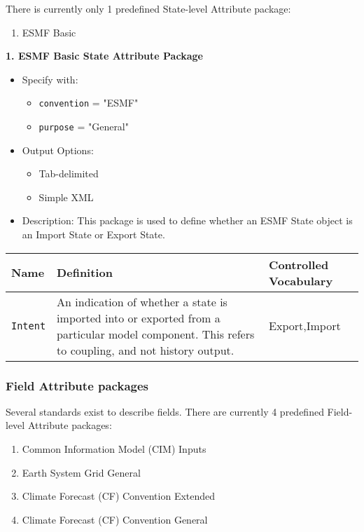 There is currently only 1 predefined State-level Attribute package:

\begin{enumerate}
    \item ESMF Basic
\end{enumerate}


\vspace{.20in}
{\bf 1. ESMF Basic State Attribute Package}

\begin{itemize}
    \item Specify with:
    \begin{itemize}
        \item {\tt convention} = "ESMF"
        \item {\tt purpose} = "General"
    \end{itemize}
    \item Output Options:
    \begin{itemize}
        \item Tab-delimited
        \item Simple XML 
    \end{itemize}
    \item Description: This package is used to define whether an ESMF State object is an Import State or Export State.   
\end{itemize}

\begin{tabular}{|p{5cm}|p{5cm}|p{4cm}|}
    \hline\hline
    {\bf Name } & {\bf Definition} & {\bf Controlled Vocabulary} \\ 
    \hline\hline
    {\tt Intent} & An indication of whether a state is imported into or exported from a particular model component. This refers to coupling, and not history output. & Export,Import \\
    \hline\hline
\end{tabular}

\vspace{.20in}

\subsubsection{Field Attribute packages}
\label{FieldAttributePackages}

Several standards exist to describe fields. There are currently 4 predefined Field-level Attribute packages:

\begin{enumerate}
    \item Common Information Model (CIM) Inputs
    \item Earth System Grid General
    \item Climate Forecast (CF) Convention Extended
    \item Climate Forecast (CF) Convention General
\end{enumerate}

